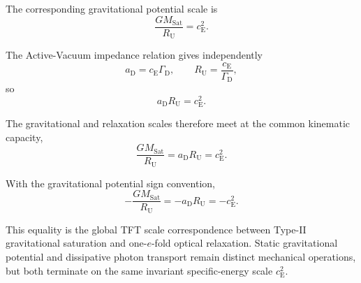 The corresponding gravitational potential scale is
\begin{equation}
    \frac{
        GM_{\mathrm{Sat}}
    }{
        R_{\mathrm U}
    }
    =
    c_{\mathrm E}^2.
\end{equation}

The Active-Vacuum impedance relation gives independently
\begin{equation}
    a_{\mathrm D}
    =
    c_{\mathrm E}\Gamma_{\mathrm D},
    \qquad
    R_{\mathrm U}
    =
    \frac{c_{\mathrm E}}
    {\Gamma_{\mathrm D}},
\end{equation}
so
\begin{equation}
    a_{\mathrm D}R_{\mathrm U}
    =
    c_{\mathrm E}^2.
\end{equation}

The gravitational and relaxation scales therefore meet at the common kinematic capacity,
\begin{equation}
    \frac{
        GM_{\mathrm{Sat}}
    }{
        R_{\mathrm U}
    }
    =
    a_{\mathrm D}R_{\mathrm U}
    =
    c_{\mathrm E}^2.
\end{equation}

With the gravitational potential sign convention,
\begin{equation}
    -\frac{
        GM_{\mathrm{Sat}}
    }{
        R_{\mathrm U}
    }
    =
    -a_{\mathrm D}R_{\mathrm U}
    =
    -c_{\mathrm E}^2.
\end{equation}

This equality is the global TFT scale correspondence between Type-II gravitational saturation and one-$e$-fold optical relaxation. Static gravitational potential and dissipative photon transport remain distinct mechanical operations, but both terminate on the same invariant specific-energy scale $c_{\mathrm E}^2$.
